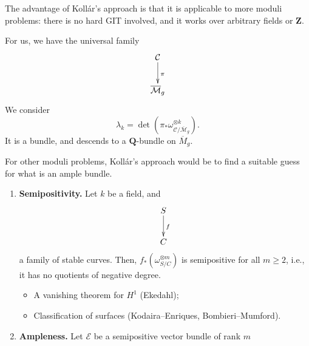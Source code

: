 The advantage of Koll\'ar's approach is that it is applicable to more moduli
problems: there is no hard GIT involved, and it works over arbitrary fields or
$\mathbf{Z}$.
\begin{situation}
  For us, we have the universal family
  $$
  \xymatrix{\mathcal{C}\ar[d]^\pi\\
  \overline{\mathcal{M}}_g}
  $$
  We consider
  $$
  \lambda_k = \det(\pi_*
  \omega_{\mathcal{C}/\overline{\mathcal{M}}_g}^{\otimes k}).
  $$
  It is a bundle, and descends to a $\mathbf{Q}$-bundle on $\overline{M}_g$.
\end{situation}
For other moduli problems, Koll\'ar's approach would be to find a suitable guess
for what is an ample bundle.
\begin{steps}\leavevmode
  \begin{enumerate}
    \item {\bf Semipositivity.} Let $k$ be a field, and
      $$
      \xymatrix{S \ar[d]^f\\C}
      $$
      a family of stable curves. Then, $f_*(\omega_{S/C}^{\otimes m})$ is
      semipositive for all $m \ge 2$, i.e., it has no quotients of negative
      degree.
      \begin{itemize}
        \item A vanishing theorem for $H^1$ (Ekedahl);
        \item Classification of surfaces (Kodaira--Enriques, Bombieri--Mumford).
      \end{itemize}
    \item {\bf Ampleness.} 
      Let $\mathcal{E}$ be a semipositive vector bundle of
      rank $m$ 
  \end{enumerate}
\end{steps}

